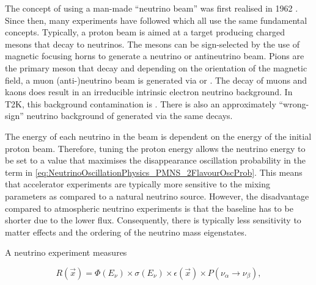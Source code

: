 The concept of using a man-made ``neutrino beam'' was first realised in 1962 \cite{Danby1962-ph}.
Since then, many experiments have followed which all use the same fundamental concepts. Typically, a proton beam is aimed at a target producing charged mesons that decay to neutrinos. The mesons can be sign-selected by the use of magnetic focusing horns to generate a neutrino or antineutrino beam.
Pions are the primary meson that decay and depending on the orientation of the magnetic field, a muon (anti-)neutrino beam is generated via \quickmath{\pi^{+} \rightarrow \mu^{+} + \nu_{\mu}} or \quickmath{\pi^{-} \rightarrow \mu^{-} + \bar{\nu}_{\mu}}. The decay of muons and kaons does result in an irreducible intrinsic electron neutrino background. In T2K, this background contamination is  \cite{Abe_2013}. There is also an approximately  ``wrong-sign'' neutrino background of \quickmath{\bar{\nu}_{\mu}} generated via the same decays.

The energy of each neutrino in the beam is dependent on the energy of the initial proton beam. Therefore, tuning the proton energy allows the neutrino energy to be set to a value that maximises the disappearance oscillation probability in the  term in \autoref{eq:NeutrinoOscillationPhysics_PMNS_2FlavourOscProb}.
This means that accelerator experiments are typically more sensitive to the mixing parameters as compared to a natural neutrino source. However, the disadvantage compared to atmospheric neutrino experiments is that the baseline has to be shorter due to the lower flux. Consequently, there is typically less sensitivity to matter effects and the ordering of the neutrino mass eigenstates.

A neutrino experiment measures

\begin{equation}
  \label{eq:NeutrinoOscillationPhysics_DetectorMeasurement}
  R(\vec{x}) = \Phi(E_{\nu}) \times \sigma(E_{\nu}) \times \epsilon(\vec{x}) \times P(\nu_{\alpha} \rightarrow \nu_{\beta}),
\end{equation}


